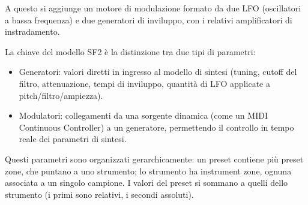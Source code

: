 A questo si aggiunge un motore di modulazione formato da due LFO (oscillatori a bassa frequenza) e due generatori di inviluppo, con i relativi amplificatori di instradamento.

La chiave del modello SF2 è la distinzione tra due tipi di parametri:
\begin{itemize}
   

 \item Generatori: valori diretti in ingresso al modello di sintesi (tuning, cutoff del filtro, attenuazione, tempi di inviluppo, quantità di LFO applicate a pitch/filtro/ampiezza).

\item Modulatori: collegamenti da una sorgente dinamica (come un MIDI Continuous Controller) a un generatore, permettendo il controllo in tempo reale dei parametri di sintesi.
\end{itemize}
Questi parametri sono organizzati gerarchicamente: un preset contiene più preset zone, che puntano a uno strumento; lo strumento ha instrument zone, ognuna associata a un singolo campione. I valori del preset si sommano a quelli dello strumento (i primi sono relativi, i secondi assoluti).